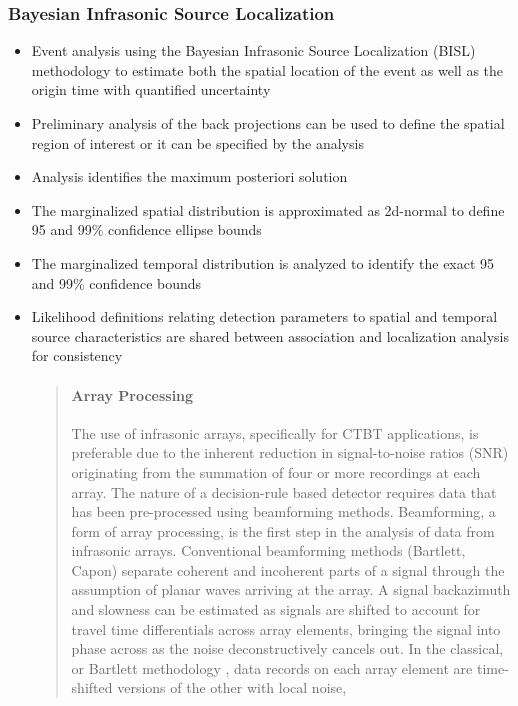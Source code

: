 \documentclass[letterpaper,10pt,english]{sphinxmanual}
\begin{document}
\subsubsection{Bayesian Infrasonic Source Localization}
\label{\detokenize{algorithms:localization}}\begin{itemize}
\item {} 
Event analysis using the Bayesian Infrasonic Source Localization (BISL) methodology to estimate both the spatial location of the event as well as the origin time with quantified uncertainty

\item {} 
Preliminary analysis of the back projections can be used to define the spatial region of interest or it can be specified by the analysis

\item {} 
Analysis identifies the maximum posteriori solution

\item {} 
The marginalized spatial distribution is approximated as 2d-normal to define 95 and 99\% confidence ellipse bounds

\item {} 
The marginalized temporal distribution is analyzed to identify the exact 95 and 99\% confidence bounds

\item {} 
Likelihood definitions relating detection parameters to spatial and temporal source characteristics are shared between association and localization analysis for consistency
\begin{quote}


\paragraph{Array Processing}
\label{\detokenize{beamforming:array-processing}}\label{\detokenize{beamforming:beamforming}}\label{\detokenize{beamforming::doc}}
The use of infrasonic arrays, specifically for CTBT applications, is preferable due to the inherent reduction in signal-to-noise ratios (SNR) originating from the summation of four or more recordings at each array. The nature of a decision-rule based detector requires data that has been pre-processed using beamforming methods. Beamforming, a form of array processing, is the first step in the analysis of data from infrasonic arrays.    Conventional beamforming methods (Bartlett, Capon) separate coherent and incoherent parts of a signal through the assumption of planar waves arriving at the array.  A signal backazimuth and slowness can be estimated as signals are shifted to account for travel time differentials across array elements, bringing the signal into phase across as the noise deconstructively cancels out.  In the classical, or Bartlett methodology , data records on each array element are time-shifted versions of the other with local noise,


\end{quote}
\end{itemize}
\end{document}
